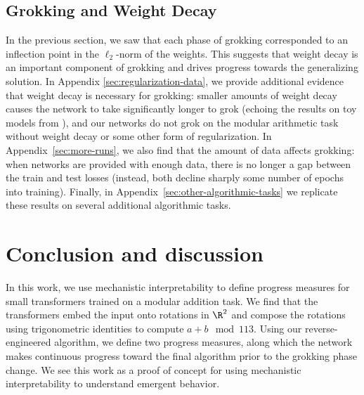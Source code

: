 \documentclass{article} %
\begin{document}
\subsection{Grokking and Weight Decay}
\label{sec:weight-decay}
In the previous section, we saw that each phase of grokking corresponded to an inflection point in the $\ell_2$-norm of the weights. This suggests that weight decay is an important component of grokking and drives progress towards the generalizing solution. %
%
%
%
In Appendix \ref{sec:regularization-data}, we provide additional evidence that weight decay is necessary for grokking: %
smaller amounts of weight decay causes the network to take significantly longer to grok (echoing the results on toy models from \citet{liu2022towards}), and our networks do not grok on the modular arithmetic task without weight decay or some other form of regularization. In Appendix~\ref{sec:more-runs}, we also find that the amount of data affects grokking: when networks are provided with enough data, there is no longer a gap between the train and test losses (instead, both decline sharply some number of epochs into training). Finally, in Appendix~\ref{sec:other-algorithmic-tasks} we replicate these results on several additional algorithmic tasks. 

\section{Conclusion and discussion}
\label{sec:discussion}
In this work, we use mechanistic interpretability to define progress measures for small transformers trained on a modular addition task. We find that the transformers embed the input onto rotations in $\R^2$ and compose the rotations using trigonometric identities to compute $a + b \mod 113$. Using our reverse-engineered algorithm, we define two progress measures, along which the network makes continuous progress toward the final algorithm prior to the grokking phase change. We see this work as a proof of concept for using mechanistic interpretability to understand emergent behavior. 
\end{document}
